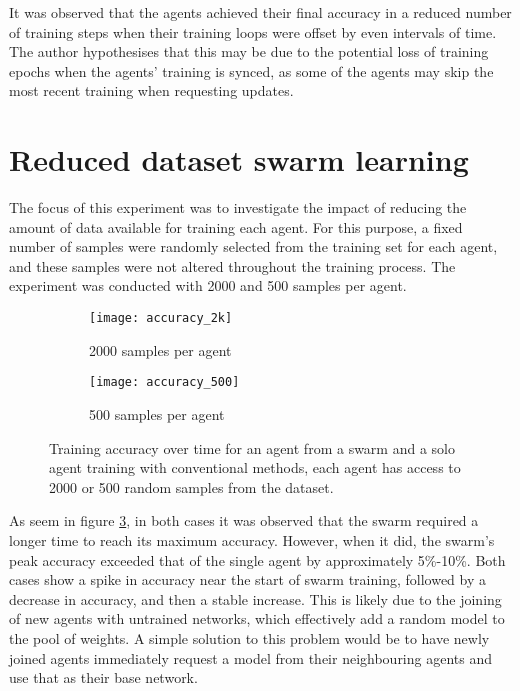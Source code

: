 It was observed that the agents achieved their final accuracy in a reduced number of training steps when their training loops were offset by even intervals of time. The author hypothesises that this may be due to the potential loss of training epochs when the agents' training is synced, as some of the agents may skip the most recent training when requesting updates.

\section{Reduced dataset swarm learning}
The focus of this experiment was to investigate the impact of reducing the amount of data available for training each agent. For this purpose, a fixed number of samples were randomly selected from the training set for each agent, and these samples were not altered throughout the training process. The experiment was conducted with 2000 and 500 samples per agent.

\begin{figure}[h]
	\centering
	\begin{subfigure}{.5\textwidth}
		\centering
		\texttt{[image: accuracy\_2k]}
		\caption{2000 samples per agent}
		\label{fig_2k}
	\end{subfigure}%
	\begin{subfigure}{.5\textwidth}
		\centering
		\texttt{[image: accuracy\_500]}
		\caption{500 samples per agent}
		\label{fig_500}
	\end{subfigure}
	\caption{Training accuracy over time for an agent from a swarm and a solo agent training with conventional methods, each agent has access to 2000 or 500 random samples from the dataset.}
	\label{fig_500_2k}
\end{figure}


As seem in figure \ref{fig_500_2k}, in both cases it was observed that the swarm required a longer time to reach its maximum accuracy. However, when it did, the swarm's peak accuracy exceeded that of the single agent by approximately 5\%-10\%. Both cases show a spike in accuracy near the start of swarm training, followed by a decrease in accuracy, and then a stable increase. This is likely due to the joining of new agents with untrained networks, which effectively add a random model to the pool of weights. A simple solution to this problem would be to have newly joined agents immediately request a model from their neighbouring agents and use that as their base network.